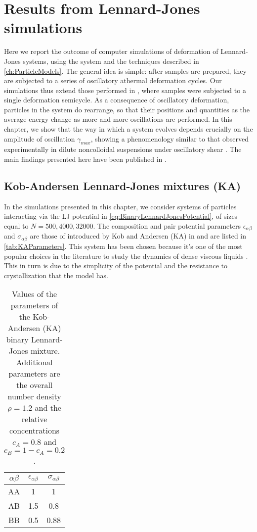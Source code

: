 \chapter{Results from Lennard-Jones simulations \label{ch:ParticleModelsResults}}
Here we report the outcome of computer simulations of deformation of Lennard-Jones systems, using the system and the techniques described in \autoref{ch:ParticleModels}. The general idea is simple: after samples are prepared, they are subjected to a series of oscillatory athermal deformation cycles. Our simulations thus extend those performed in \cite{lacks2004energy}, where samples were subjected to a single deformation semicycle. As a consequence of oscillatory deformation, particles in the system do rearrange, so that their positions and quantities as the average energy change as more and more oscillations are performed. In this chapter, we show that the way in which a system evolves depends crucially on the amplitude of oscillation $\gamma_{max}$, showing a phenomenology similar to that observed experimentally in dilute noncolloidal suspensions under oscillatory shear \cite{corte2008random}.  
The main findings presented here have been published in \cite{fiocco2013oscillatory}.

\section{Kob-Andersen Lennard-Jones mixtures (KA)}
In the simulations presented in this chapter, we consider systems of particles interacting via the LJ potential in \autoref{eq:BinaryLennardJonesPotential}, of sizes equal to $N=500, 4000, 32000$. The composition and pair potential parameters $\epsilon_{\alpha \beta}$ and $\sigma_{\alpha \beta}$ are those of introduced by Kob and Andersen (KA) in \cite{kob1994scaling} and are listed in \autoref{tab:KAParameters}.
This system has been chosen because it's one of the most popular choices in the literature to study the dynamics of dense viscous liquids \cite{binder2011glassy}. This in turn is due to the simplicity of the potential and the resistance to crystallization \cite{toxvaerd2009stability} that the model has.
\begin{table}
\centering
\begin{tabular}{ccc}
\toprule
$\alpha \beta$	&	$\epsilon_{\alpha \beta}$	&	$\sigma_{\alpha \beta}$	\\ 
\midrule
AA		&	1				&	1	 			\\
AB		&	1.5				&	0.8	 			\\
BB		&	0.5				&	0.88	 		\\
\bottomrule 
\end{tabular}
\caption{Values of the parameters of the Kob-Andersen (KA) binary Lennard-Jones mixture. Additional parameters are the overall number density $\rho = 1.2$ and the relative concentrations $c_{A} = 0.8$ and $c_{B} = 1 - c_{A} = 0.2$.}
\label{tab:KAParameters}
\end{table}

